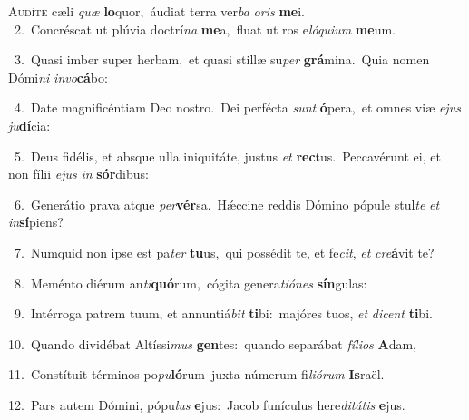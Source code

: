 \lettrine{\initial\textcolor{\initialcolor}{A}}{udíte} cæli \textit{quæ} \textbf{lo}\-quor,~\star áudiat terra ver\textit{ba} \textit{o}\-\textit{ris} \textbf{me}\-i.\\
{\numbfont\textcolor{\numbcolor}{~2.}}~Concréscat ut plúvia doctrí\textit{na} \textbf{me}\-a,~\star fluat ut ros e\-\textit{ló}\-\textit{qui}\textit{um} \textbf{me}\-um.\par
{\numbfont\textcolor{\numbcolor}{~3.}}~Quasi imber super herbam,~\dagger et quasi stillæ su\textit{per} \textbf{grá}\-mina.~\star Quia nomen Dómi\textit{ni} \textit{in}\-\textit{vo}\textbf{cá}bo:\par
{\numbfont\textcolor{\numbcolor}{~4.}}~Date magnificéntiam Deo nostro.~\dagger Dei perfécta \textit{sunt} \textbf{ó}\-pera,~\star et omnes viæ \textit{e}\-\textit{jus} \textit{ju}\-\textbf{dí}cia:\par
{\numbfont\textcolor{\numbcolor}{~5.}}~Deus fidélis, et absque ulla iniquitáte, justus \textit{et} \textbf{rec}\-tus.~\star Peccavérunt ei, et non fílii \textit{e}\-\textit{jus} \textit{in} \textbf{sór}\-dibus:\par
{\numbfont\textcolor{\numbcolor}{~6.}}~Generátio prava atque \textit{per}\-\textbf{vér}sa.~\star Hǽccine reddis Dómino pópule stul\textit{te} \textit{et} \textit{in}\-\textbf{sí}piens?\par
{\numbfont\textcolor{\numbcolor}{~7.}}~Numquid non ipse est pa\textit{ter} \textbf{tu}\-us,~\star qui possédit te, et fe\-\textit{cit}\-, \textit{et} \textit{cre}\-\textbf{á}vit te?\par
{\numbfont\textcolor{\numbcolor}{~8.}}~Meménto diérum an\-\textit{ti}\-\textbf{quó}rum,~\star cógita genera\-\textit{ti}\-\textit{ó}\textit{nes} \textbf{sín}\-gulas:\par
{\numbfont\textcolor{\numbcolor}{~9.}}~Intérroga patrem tuum, et annuntiá\textit{bit} \textbf{ti}\-bi:~\star majóres tuos, \textit{et} \textit{di}\-\textit{cent} \textbf{ti}\-bi.\par
{\numbfont\textcolor{\numbcolor}{10.}}~Quando dividébat Altíssi\textit{mus} \textbf{gen}\-tes:~\star quando separábat \textit{fí}\-\textit{li}\textit{os} \textbf{A}\-dam,\par
{\numbfont\textcolor{\numbcolor}{11.}}~Constítuit términos po\-\textit{pu}\-\textbf{ló}rum~\star juxta númerum fi\-\textit{li}\-\textit{ó}\textit{rum} \textbf{Is}\-raël.\par
{\numbfont\textcolor{\numbcolor}{12.}}~Pars autem Dómini, pópu\textit{lus} \textbf{e}\-jus:~\star Jacob funículus here\-\textit{di}\-\textit{tá}\textit{tis} \textbf{e}\-jus.\par
